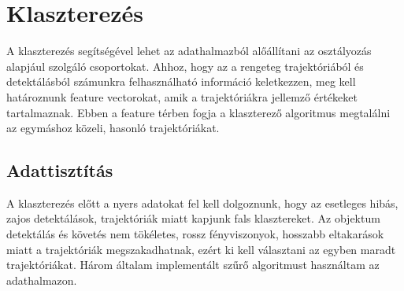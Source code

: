 \documentclass[12pt,a4paper]{article}
\begin{document}
\newpage
\section{Klaszterezés}
A klaszterezés segítségével lehet az adathalmazból alőállítani az osztályozás alapjául szolgáló csoportokat. Ahhoz, hogy az
a rengeteg trajektóriából és detektálásból számunkra felhasználható információ keletkezzen, meg kell határoznunk feature
vectorokat, amik a trajektóriákra jellemző értékeket tartalmaznak. Ebben a feature térben fogja a klaszterező algoritmus
megtalálni az egymáshoz közeli, hasonló trajektóriákat.
\subsection{Adattisztítás}
A klaszterezés előtt a nyers adatokat fel kell dolgoznunk, hogy az esetleges hibás, zajos detektálások, trajektóriák miatt
kapjunk fals klasztereket. Az objektum detektálás és követés nem tökéletes, rossz fényviszonyok, hosszabb eltakarások miatt
a trajektóriák megszakadhatnak, ezért ki kell választani az egyben maradt trajektóriákat. Három általam implementált szűrő algoritmust használtam
az adathalmazon.
\end{document}
